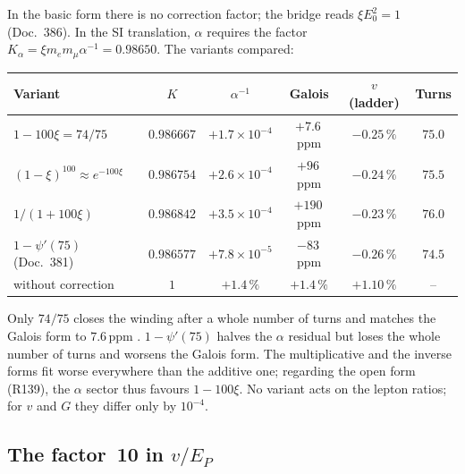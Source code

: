 In the basic form there is no correction factor; the bridge reads $\xi E_0^2=1$ (Doc.~386). In the
SI translation, $\alpha$ requires the factor $K_\alpha=\xi m_em_\mu\alpha^{-1}=0.98650$. The variants
compared:
\begin{center}
\small
\begin{tabular}{@{}lccccc@{}}
\toprule
\textbf{Variant} & $K$ & $\alpha^{-1}$ & \textbf{Galois} & $v$ (ladder) & \textbf{Turns} \\
\midrule
$1-100\xi=74/75$ & $0.986667$ & $+1.7\times10^{-4}$ & $+7.6$\,ppm & $-0.25\,\%$ & $75.0$ \\
$(1-\xi)^{100}\approx e^{-100\xi}$ & $0.986754$ & $+2.6\times10^{-4}$ & $+96$\,ppm & $-0.24\,\%$ & $75.5$ \\
$1/(1+100\xi)$ & $0.986842$ & $+3.5\times10^{-4}$ & $+190$\,ppm & $-0.23\,\%$ & $76.0$ \\
$1-\psi'(75)$ (Doc.~381) & $0.986577$ & $+7.8\times10^{-5}$ & $-83$\,ppm & $-0.26\,\%$ & $74.5$ \\
without correction & $1$ & $+1.4\,\%$ & $+1.4\,\%$ & $+1.10\,\%$ & -- \\
\bottomrule
\end{tabular}
\end{center}
Only $74/75$ closes the winding after a whole number of turns and matches the Galois form to
$7.6$\,ppm \KM. $1-\psi'(75)$ halves the $\alpha$ residual but loses the whole number of turns and
worsens the Galois form. The multiplicative and the inverse forms fit worse everywhere than the
additive one; regarding the open form (R139), the $\alpha$ sector thus favours $1-100\xi$. No
variant acts on the lepton ratios; for $v$ and $G$ they differ only by $10^{-4}$.

\subsection{The factor~10 in \texorpdfstring{$v/E_P$}{v/E\_P}}

